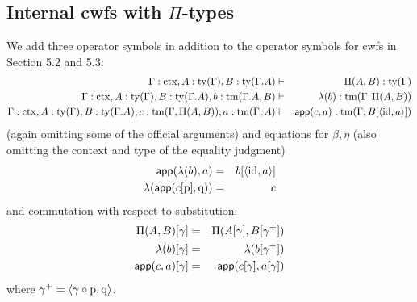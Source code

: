 \documentclass{mscs}
\newcommand{\FYI}[1]{{#1}}
\def\V{\mathrm{V}}
\def\Cwf{\mathbf{CwF}}
\def\id{\mathrm{id}}
\newcommand{\ctx}{\mathrm{ctx}}
\newcommand{\ty}{\mathrm{ty}}
\newcommand{\tm}{\mathrm{tm}}
\begin{document}



\subsection{Internal cwfs with $\Pi$-types}
We add three operator symbols in addition to the operator symbols for cwfs in Section 5.2 and 5.3:
\begin{eqnarray*}
\Gamma : \ctx, A : \ty(\Gamma), B : \ty(\Gamma.A)&\vdash& \Pi(A,B) : \ty(\Gamma)\\
\Gamma : \ctx, A : \ty(\Gamma), B : \ty(\Gamma.A), b : \tm(\Gamma.A, B) &\vdash& \lambda(b) : \tm(\Gamma,\Pi(A,B))\\
\Gamma : \ctx, A : \ty(\Gamma), B : \ty(\Gamma.A), c :  \tm(\Gamma,\Pi(A,B)), a : \tm(\Gamma, A) &\vdash& \app(c,a) : \tm(\Gamma, B[\tuple{\id,a}])
\end{eqnarray*}
(again omitting some of the official arguments)
and equations for $\beta, \eta$ (also omitting the context and type of the equality judgment)
 \begin{eqnarray*}
 \app(\lambda(b),a) &=& b[\tuple{\id,a}]\\
 \lambda(\app(c[\p],\q)) &=& c
\end{eqnarray*}
and commutation with respect to substitution:
\begin{eqnarray*}
\Pi(A,B)[ \gamma ] &=& \Pi(A [ \gamma ], B[ \gamma^+ ])\\
\lambda(b) [ \gamma ] &=& \lambda(b[\gamma^+ ])\\
\mathsf{app}(c,a) [ \gamma ] &=& \mathsf{app}(c[ \gamma ], a[ \gamma ] )
\end{eqnarray*}
where $\gamma^+ = \langle \gamma \circ \mathrm{p}, \mathrm{q} \rangle$.
\end{document}
